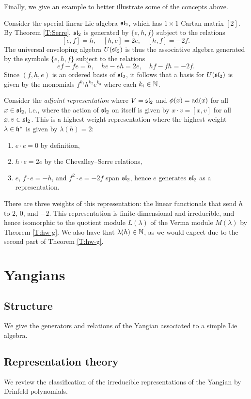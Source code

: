 Finally, we give an example to better illustrate some of the concepts above.

\begin{example}\label{E:sl2}
    Consider the special linear Lie algebra $\mathfrak{sl}_2$, which has $1\times 1$ Cartan matrix $[2]$.
    By Theorem \ref{T:Serre}, $\mathfrak{sl}_2$ is generated by $\{e,h,f\}$ subject to the relations
    \[[e,f]=h, \quad [h,e]=2e, \quad [h,f]=-2f.\]
    The universal enveloping algebra $U(\mathfrak{sl}_2)$ is thus the associative algebra generated by the symbols $\{e,h,f\}$ subject to the relations
    \[ef-fe=h, \quad he-eh=2e, \quad hf-fh=-2f.\]
    Since $(f,h,e)$ is an ordered basis of $\mathfrak{sl}_2$, it follows that a basis for $U(\mathfrak{sl}_2)$ is given by the monomials $f^{k_1}h^{k_2}e^{k_3}$ where each $k_i\in\mathbb{N}$.

    Consider the \emph{adjoint representation} where $V=\mathfrak{sl}_2$ and $\phi(x)=\operatorname{ad}(x)$ for all $x\in\mathfrak{sl}_2$, i.e., where the action of $\mathfrak{sl}_2$ on itself is given by $x\cdot v=[x,v]$ for all $x,v\in\mathfrak{sl}_2$.
    This is a highest-weight representation where the highest weight $\lambda\in\mathfrak{h}^*$ is given by $\lambda(h)=2$:
    \begin{enumerate}
        \item $e\cdot e = 0$ by definition,
        \item $h\cdot e = 2e$ by the Chevalley--Serre relations,
        \item $e$, $f\cdot e = -h$, and $f^2\cdot e = -2f$ span $\mathfrak{sl}_2$, hence $e$ generates $\mathfrak{sl}_2$ as a representation.
    \end{enumerate}
    There are three weights of this representation: the linear functionals that send $h$ to $2$, $0$, and $-2$.
    This representation is finite-dimensional and irreducible, and hence isomorphic to the quotient module $L(\lambda)$ of the Verma module $M(\lambda)$ by Theorem \ref{T:hw-g}.
    We also have that $\lambda(h)\in\mathbb{N}$, as we would expect due to the second part of Theorem \ref{T:hw-g}.
\end{example}


\section{Yangians}

\subsection{Structure}

We give the generators and relations of the Yangian associated to a simple Lie algebra.

\subsection{Representation theory}

We review the classification of the irreducible representations of the Yangian by Drinfeld polynomials.
